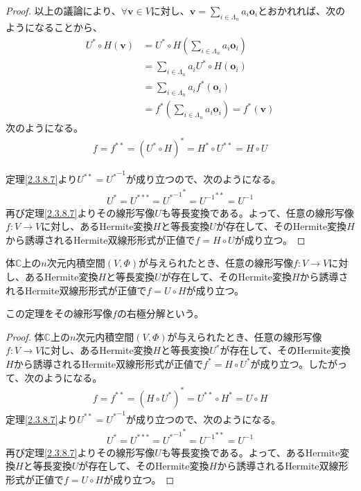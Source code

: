 \documentclass[dvipdfmx]{jsarticle}
\begin{document}
\begin{proof}
以上の議論により、$\forall\mathbf{v} \in V$に対し、$\mathbf{v} = \sum_{i \in \varLambda_{n}} {a_{i}\mathbf{o}_{i}}$とおかれれば、次のようになることから、
\begin{align*}
U^{*} \circ H\left( \mathbf{v} \right) &= U^{*} \circ H\left( \sum_{i \in \varLambda_{n}} {a_{i}\mathbf{o}_{i}} \right)\\
&= \sum_{i \in \varLambda_{n}} {a_{i}U^{*} \circ H\left( \mathbf{o}_{i} \right)}\\
&= \sum_{i \in \varLambda_{n}} {a_{i}f^{*}\left( \mathbf{o}_{i} \right)}\\
&= f^{*}\left( \sum_{i \in \varLambda_{n}} {a_{i}\mathbf{o}_{i}} \right) = f^{*}\left( \mathbf{v} \right)
\end{align*}
次のようになる。
\begin{align*}
f = f^{**} = \left( U^{*} \circ H \right)^{*} = H^{*} \circ U^{**} = H \circ U
\end{align*}\par
定理\ref{2.3.8.7}より$U^{**} = {U^{*}}^{- 1}$が成り立つので、次のようになる。
\begin{align*}
U^{*} = U^{***} = {{U^{*}}^{- 1}}^{*} = {U^{- 1}}^{**} = U^{- 1}
\end{align*}
再び定理\ref{2.3.8.7}よりその線形写像$U$も等長変換である。よって、任意の線形写像$f:V \rightarrow V$に対し、あるHermite変換$H$と等長変換$U$が存在して、そのHermite変換$H$から誘導されるHermite双線形形式が正値で$f = H \circ U$が成り立つ。
\end{proof}
\begin{thm}[右極分解]\label{2.3.11.7}
体$\mathbb{C}$上の$n$次元内積空間$(V,\varPhi)$が与えられたとき、任意の線形写像$f:V \rightarrow V$に対し、あるHermite変換$H$と等長変換$U$が存在して、そのHermite変換$H$から誘導されるHermite双線形形式が正値で$f = U \circ H$が成り立つ。\par
この定理をその線形写像$f$の右極分解という。
\end{thm}
\begin{proof}
体$\mathbb{C}$上の$n$次元内積空間$(V,\varPhi)$が与えられたとき、任意の線形写像$f:V \rightarrow V$に対し、あるHermite変換$H$と等長変換$U^{*}$が存在して、そのHermite変換$H$から誘導されるHermite双線形形式が正値で$f^{*} = H \circ U^{*}$が成り立つ。したがって、次のようになる。
\begin{align*}
f = f^{**} = \left( H \circ U^{*} \right)^{*} = U^{**} \circ H^{*} = U \circ H
\end{align*}
定理\ref{2.3.8.7}より$U^{**} = {U^{*}}^{- 1}$が成り立つので、次のようになる。
\begin{align*}
U^{*} = U^{***} = {{U^{*}}^{- 1}}^{*} = {U^{- 1}}^{**} = U^{- 1}
\end{align*}
再び定理\ref{2.3.8.7}よりその線形写像$U$も等長変換である。よって、あるHermite変換$H$と等長変換$U$が存在して、そのHermite変換$H$から誘導されるHermite双線形形式が正値で$f = U \circ H$が成り立つ。
\end{proof}
\end{document}
